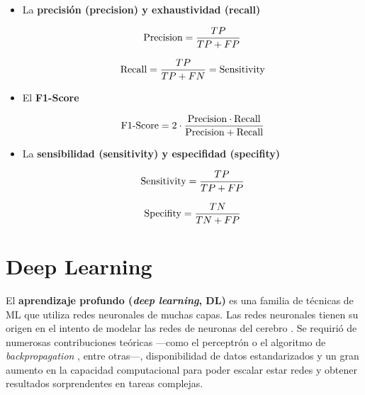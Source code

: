 \begin{itemize}
    \item La \textbf{precisión (precision) y exhaustividad (recall)} 
    
    $$
    \textnormal{Precision} = \frac{TP}{TP+FP}
    $$

    $$
    \textnormal{Recall} = \frac{TP}{TP+FN} = \textnormal{Sensitivity}
    $$
    

    \item El \textbf{F1-Score} 

    $$
    \textnormal{F1-Score} = 2 \cdot \frac{\textnormal{Precision} \cdot \textnormal{Recall}}{\textnormal{Precision} + \textnormal{Recall}}
    $$


    \item La \textbf{sensibilidad (sensitivity) y especifidad (specifity)}

    $$
    \textnormal{Sensitivity} = \frac{TP}{TP+FP}
    $$

    $$
    \textnormal{Specifity} = \frac{TN}{TN+FP}
    $$


\end{itemize}




\section{Deep Learning}

El \textbf{aprendizaje profundo (\textit{deep learning}, DL)} es una familia de técnicas de ML que utiliza
redes neuronales de muchas capas. 
Las redes neuronales tienen su origen en el intento de modelar las redes de neuronas del cerebro 
\cite{mcculloch1943}. Se requirió de numerosas contribuciones teóricas ---como el perceptrón \cite{rosenblatt1958} 
o el algoritmo de \textit{backpropagation} \cite{rumelhart1986,werbos1994}, entre otras---, disponibilidad de datos 
estandarizados y un gran aumento en la capacidad computacional para poder escalar estar redes y obtener resultados 
sorprendentes en tareas complejas.

